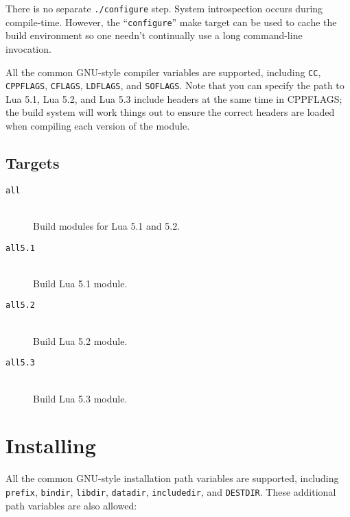 \documentclass[11pt, oneside]{memoir}
\begin{document}
There is no separate \texttt{./configure} step. System introspection occurs during compile-time. However, the ``\texttt{configure}'' make target can be used to cache the build environment so one needn't continually use a long command-line invocation.

All the common GNU-style compiler variables are supported, including \texttt{CC}, \texttt{CPPFLAGS}, \texttt{CFLAGS}, \texttt{LDFLAGS}, and \texttt{SOFLAGS}. Note that you can specify the path to Lua 5.1, Lua 5.2, and Lua 5.3 include headers at the same time in CPPFLAGS; the build system will work things out to ensure the correct headers are loaded when compiling each version of the module.

\subsection{Targets}

\begin{description}
\item[\texttt{all}] \hfill \\
Build modules for Lua 5.1 and 5.2.

\item[\texttt{all5.1}] \hfill \\
Build Lua 5.1 module.

\item[\texttt{all5.2}] \hfill \\
Build Lua 5.2 module.

\item[\texttt{all5.3}] \hfill \\
Build Lua 5.3 module.

\end{description}

\section{Installing}

All the common GNU-style installation path variables are supported, including \texttt{prefix}, \texttt{bindir}, \texttt{libdir}, \texttt{datadir}, \texttt{includedir}, and \texttt{DESTDIR}. These additional path variables are also allowed:
\end{document}
